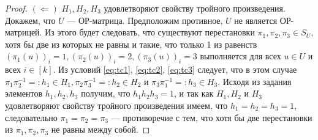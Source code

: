 \begin{proof}
$(\Longleftarrow)$ $H_1,H_2,H_3$ удовлетворяют свойству тройного произведения. Докажем, что $U$ --- ОР-матрица. Предположим противное, $U$ не является ОР-матрицей. Из этого будет следовать, что существуют перестановки $\pi_1, \pi_2, \pi_3 \in S_U$, хотя бы две из которых не равны и такие, что только 1 из равенств $(\pi_1(u))_i=1, (\pi_2(u))_i=2, (\pi_3(u))_i=3$ выполняется для всех $u \in U$ и всех $i \in [k]$. Из условий \eqref{eq:tc1}, \eqref{eq:tc2}, \eqref{eq:tc3} следует, что в этом случае $\pi_1 \pi_2^{-1} =: h_1 \in H_1, \pi_2 \pi_3^{-1} =: h_2 \in H_2$ и $\pi_3 \pi_1^{-1} =: h_3 \in H_3$. Исходя из задания элементов $h_1, h_2, h_3$ получим, что $h_1 h_2 h_3 = 1$, и так как $H_1, H_2$ и $H_3$ удовлетворяют свойству тройного произведения имеем, что $h_1=h_2=h_3=1$, следовательно $\pi_1= \pi_2= \pi_3$ --- противоречие с тем, что хотя бы две перестановки из $\pi_1, \pi_2, \pi_3$ не равны между собой. 
\end{proof}

